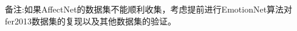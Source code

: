 \documentclass[11pt, a4paper]{article}
\begin{document}
备注:如果AffectNet的数据集不能顺利收集，考虑提前进行EmotionNet算法对fer2013数据集的复现以及其他数据集的验证。






  
% 





\end{document}

